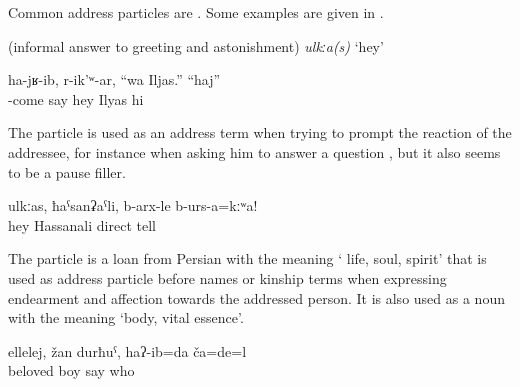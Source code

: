 Common address particles are . Some examples are given in .
%
\begin{exe}
	\ex	\label{ex:pause fillers interjections minor}
	\begin{xlist}
		\ex	{} 	
		\ex	{}  (informal answer to greeting and astonishment)	
		\ex	{} 	
		\ex \textit{ulkːa(s)} `hey'
		\ex	{} 	
	\end{xlist}

	\ex	\label{ex:‎He came, and she said (to him), Hey Iljas. (He said), Hi minor}
	\gll	ha-jʁ-ib,	r-ik'ʷ-ar,	``wa	Iljas.''	``haj''\\
		-come	say	hey	Ilyas		hi\\
	\glt	{}

\end{exe}

The particle  is used as an address term when trying to prompt the reaction of the addressee, for instance when asking him to answer a question , but it also seems to be a pause filler. 

%
\begin{exe}
	\ex	\label{ex:Hey, Hasanali, tell the truth minor}
	\gll	ulkːas,	ħaˁsanʡaˁli,	b-arx-le	b-urs-a=kːʷa!\\
		hey	Hassanali	direct	tell\\
	\glt	{}
\end{exe}

The particle   is a loan from Persian with the meaning ` life, soul, spirit' that is used as address particle before names or kinship terms when expressing endearment and affection towards the addressed person. It is also used as a noun with the meaning `body, vital essence'.

\begin{exe}
	\ex	\label{ex:‎Ooh, my dear boy, I thought, who are you minor}
	\gll	ellelej,	žan	durħuˁ,	haʔ-ib=da	ča=de=l\\
		 beloved	boy	say	who\\
	\glt	{}
\end{exe}

